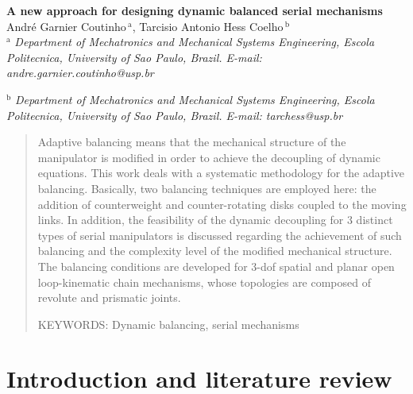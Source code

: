 \documentclass[a4paper,11pt,brazil,fleqn]{article}
\begin{document}

\noindent
{\bf \huge A new approach for designing dynamic balanced serial mechanisms}\\


\noindent
{\Large 		Andr\'e Garnier Coutinho$\,{}^\text{a}$,
			Tarcisio Antonio Hess Coelho$\,{}^\text{b}$
}\\

\noindent
{${}^\text{a}$ \it Department of Mechatronics and Mechanical Systems Engineering, Escola Politecnica, 
University of Sao Paulo, Brazil. E-mail: andre.garnier.coutinho@usp.br}

\noindent
{${}^\text{b}$ \it Department of Mechatronics and Mechanical Systems Engineering, Escola Politecnica, 
University of Sao Paulo, Brazil. E-mail: tarchess@usp.br}

\vspace{24pt}


\begin{abstract}

Adaptive balancing means that the mechanical structure of the manipulator is modified in order to achieve the decoupling of dynamic equations. This work deals with a systematic methodology for the adaptive balancing. Basically, two balancing techniques are employed here: the addition of counterweight and counter-rotating disks coupled to the moving links. In addition, the feasibility of the dynamic decoupling for 3 distinct types of serial manipulators is discussed regarding the achievement of such balancing and the complexity level of the modified mechanical structure. The balancing conditions are developed for 3-dof spatial and planar open loop-kinematic chain mechanisms, whose topologies are composed of revolute and prismatic joints.

\vspace{10pt}

\noindent
KEYWORDS: {Dynamic balancing, serial mechanisms}
\end{abstract}







\section{Introduction and literature review}\label{S01}
\end{document}

